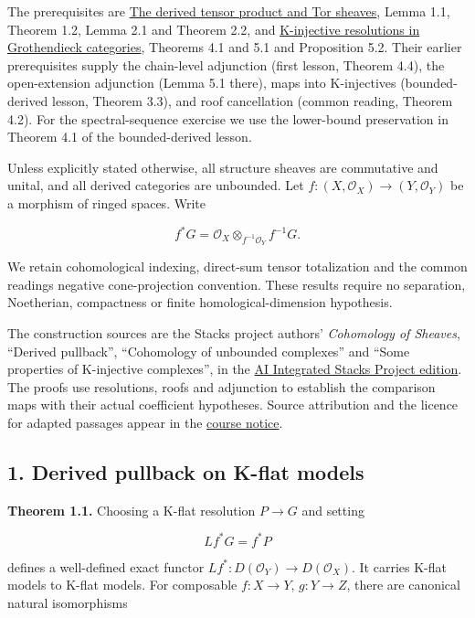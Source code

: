 \documentclass[
  english,
  11pt,
  a4paper,
]{article}
\begin{document}
The prerequisites are
\hyperref[derived-tensor-products-and-tor-sheaves]{The derived tensor
product and Tor sheaves}, Lemma 1.1, Theorem 1.2, Lemma 2.1 and Theorem
2.2, and
\hyperref[k-injective-resolutions-in-grothendieck-categories]{K-injective
resolutions in Grothendieck categories}, Theorems 4.1 and 5.1 and
Proposition 5.2. Their earlier prerequisites supply the chain-level
adjunction (first lesson, Theorem 4.4), the open-extension adjunction
(Lemma 5.1 there), maps into K-injectives (bounded-derived lesson,
Theorem 3.3), and roof cancellation (common reading, Theorem 4.2). For
the spectral-sequence exercise we use the lower-bound preservation in
Theorem 4.1 of the bounded-derived lesson.

Unless explicitly stated otherwise, all structure sheaves are
commutative and unital, and all derived categories are unbounded. Let
\(f:(X,\mathcal O_X)\to(Y,\mathcal O_Y)\) be a morphism of ringed
spaces. Write

\[f^*G=\mathcal O_X\otimes_{f^{-1}\mathcal O_Y}f^{-1}G.
\tag{0.1}\]

We retain cohomological indexing, direct-sum tensor totalization and the
common reading\textquotesingle s negative cone-projection convention.
These results require no separation, Noetherian, compactness or finite
homological-dimension hypothesis.

The construction sources are the Stacks project authors'
\emph{Cohomology of Sheaves}, ``Derived pullback'', ``Cohomology of
unbounded complexes'' and ``Some properties of K-injective complexes'',
in the
\href{https://github.com/KokunoYumeto/unofficial-stacks-project-ai-drafts/blob/565b10e987aba5969b21145a0833f42d69f96790/cohomology.tex}{AI
Integrated Stacks Project edition}. The proofs use resolutions, roofs
and adjunction to establish the comparison maps with their actual
coefficient hypotheses. Source attribution and the licence for adapted
passages appear in the \hyperref[sources-and-authorship]{course notice}.

\subsection{1. Derived pullback on K-flat
models}\label{derived-pullback-and-pushforward--1-derived-pullback-on-k-flat-models}

\textbf{Theorem 1.1.} Choosing a K-flat resolution \(P\to G\) and
setting

\[Lf^*G=f^*P
\tag{1.1}\]

defines a well-defined exact functor
\(Lf^*:D(\mathcal O_Y)\to D(\mathcal O_X)\). It carries K-flat models to
K-flat models. For composable \(f:X\to Y\), \(g:Y\to Z\), there are
canonical natural isomorphisms
\end{document}
